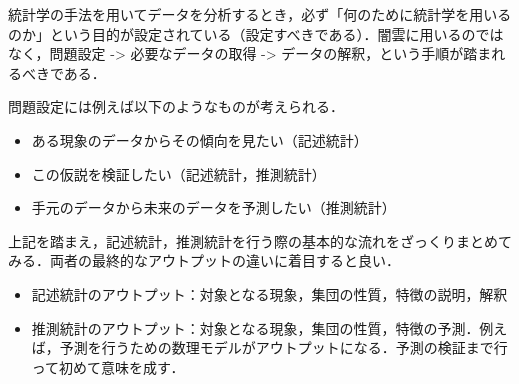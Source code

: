 統計学の手法を用いてデータを分析するとき，必ず「何のために統計学を用いるのか」という目的が設定されている（設定すべきである）．闇雲に用いるのではなく，問題設定 -> 必要なデータの取得 -> データの解釈，という手順が踏まれるべきである．

問題設定には例えば以下のようなものが考えられる．

\begin{itemize}
    \item ある現象のデータからその傾向を見たい（記述統計）
    \item この仮説を検証したい（記述統計，推測統計）
    \item 手元のデータから未来のデータを予測したい（推測統計）
\end{itemize}

上記を踏まえ，記述統計，推測統計を行う際の基本的な流れをざっくりまとめてみる．両者の最終的なアウトプットの違いに着目すると良い．

\vspace{10pt}


\vspace{10pt}

\vspace{10pt}

\begin{itemize}
    \item 記述統計のアウトプット：対象となる現象，集団の性質，特徴の説明，解釈
    \item 推測統計のアウトプット：対象となる現象，集団の性質，特徴の予測．例えば，予測を行うための数理モデルがアウトプットになる．予測の検証まで行って初めて意味を成す．
\end{itemize}


